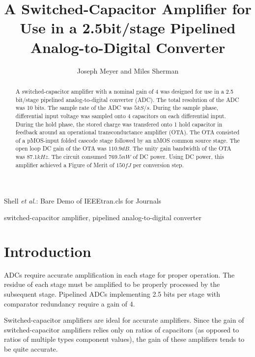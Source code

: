 \documentclass[journal]{IEEEtran}
\begin{document}
\title{A Switched-Capacitor Amplifier for Use in a 2.5bit/stage Pipelined Analog-to-Digital Converter }

\author{Joseph Meyer and Miles Sherman}

%
{Shell \MakeLowercase{\textit{et al.}}: Bare Demo of IEEEtran.cls for Journals}
\maketitle

\begin{abstract}
A switched-capacitor amplifier with a nominal gain of 4 was designed for use in a 2.5 bit/stage pipelined analog-to-digital converter (ADC). The total resolution of the ADC was 10 bits. The sample rate of the ADC was $5kS/s$. During the sample phase, differential input voltage was sampled onto 4 capacitors on each differential input. During the hold phase, the stored charge was transfered onto 1 hold capacitor in feedback around an operational transconductance amplifier (OTA). The OTA consisted of a pMOS-input folded cascode stage followed by an nMOS common source stage. The open loop DC gain of the OTA was $110.9dB$. The unity gain bandwidth of the OTA was $87.1kHz$. The circuit consumed $769.5nW$ of DC power. Using DC power, this amplifier achieved a Figure of Merit of $150fJ$ per conversion step.
\end{abstract}

\begin{IEEEkeywords}
switched-capacitor amplifier, pipelined analog-to-digital converter
\end{IEEEkeywords}

\section{Introduction}
 ADCs require accurate amplification in each stage for proper operation. The residue of each stage must be amplified to be properly processed by the subsequent stage. Pipelined ADCs implementing 2.5 bits per stage with comparator redundancy require a gain of 4. 

Switched-capacitor amplifiers are ideal for accurate amplifiers. Since the gain of switched-capacitor amplifiers relies only on ratios of capacitors (as opposed to ratios of multiple types component values), the gain of these amplifiers tends to be quite accurate.
\end{document}
